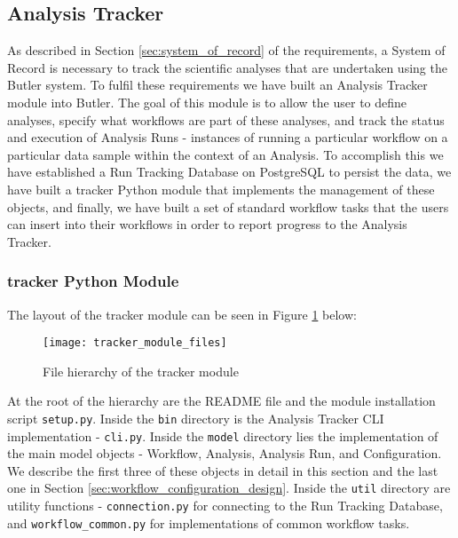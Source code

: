 \subsection{Analysis Tracker} 
\label{sec:analysis_tracker}

As described in Section \ref{sec:system_of_record} of the requirements, a System of Record is necessary to track the scientific analyses that are undertaken using the Butler system. To fulfil these requirements we have built an Analysis Tracker module into Butler. The goal of this module is to allow the user to define analyses, specify what workflows are part of these analyses, and track the status and execution of Analysis Runs - instances of running a particular workflow on a particular data sample within the context of an Analysis. To accomplish this we have established a Run Tracking Database on PostgreSQL to persist the data, we have built a tracker Python module that implements the management of these objects, and finally, we have built a set of standard workflow tasks that the users can insert into their workflows in order to report progress to the Analysis Tracker.

\subsubsection{tracker Python Module}

The layout of the tracker module can be seen in Figure \ref{fig:tracker_module_files} below:

\begin{figure}[H]
\texttt{[image: tracker\_module\_files]}
\centering
\caption {File hierarchy of the tracker module}
\label{fig:tracker_module_files}
\end{figure}

At the root of the hierarchy are the README file and the module installation script \texttt{setup.py}. Inside the \texttt{bin} directory is the Analysis Tracker CLI implementation - \texttt{cli.py}. Inside the \texttt{model} directory lies the implementation of the main model objects - Workflow, Analysis, Analysis Run, and Configuration. We describe the first three of these objects in detail in this section and the last one in Section \ref{sec:workflow_configuration_design}. Inside the \texttt{util} directory are utility functions -  \texttt{connection.py} for connecting to the Run Tracking Database, and  \texttt{workflow_common.py} for implementations of common workflow tasks.

